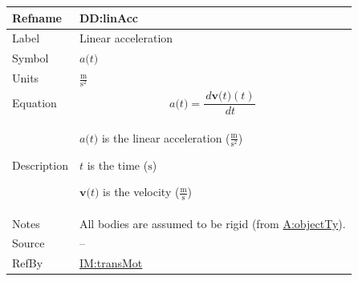 \documentclass[12pt]{article}
\begin{document}
\medskip
\noindent
\begin{minipage}{\textwidth}
\begin{tabular}{>{\raggedright}p{}>{\raggedright\arraybackslash}p{}}
\toprule \textbf{Refname} & \textbf{DD:linAcc}
\label{DD:linAcc}
\\ \midrule
Label & Linear acceleration
        
\\ \midrule
Symbol & $a\text{(}t\text{)}$
         
\\ \midrule
Units & $\frac{\text{m}}{\text{s}^{2}}$
        
\\ \midrule
Equation & \begin{displaymath}
           a\text{(}t\text{)}=\frac{\,d\symbf{v}\text{(}t\text{)}\left(t\right)}{\,dt}
           \end{displaymath}
\\ \midrule
Description & \begin{symbDescription}
              \item{$a\text{(}t\text{)}$ is the linear acceleration ($\frac{\text{m}}{\text{s}^{2}}$)}
              \item{$t$ is the time (${\text{s}}$)}
              \item{$\symbf{v}\text{(}t\text{)}$ is the velocity ($\frac{\text{m}}{\text{s}}$)}
              \end{symbDescription}
\\ \midrule
Notes & All bodies are assumed to be rigid (from \hyperref[assumpOT]{A:objectTy}).
        
\\ \midrule
Source & --
         
\\ \midrule
RefBy & \hyperref[IM:transMot]{IM:transMot}
        
\\ \bottomrule
\end{tabular}
\end{minipage}
\end{document}
